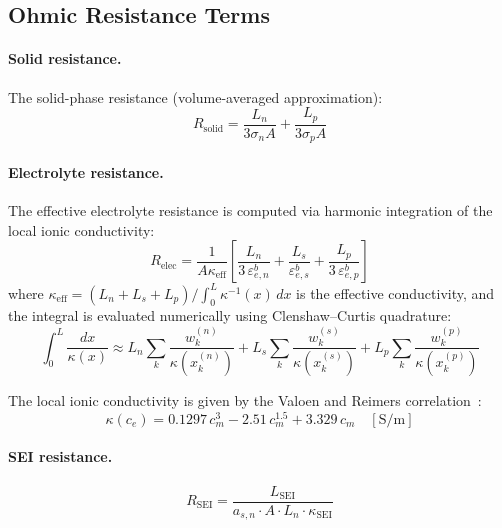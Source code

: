 \subsection{Ohmic Resistance Terms}

\paragraph{Solid resistance.} The solid-phase resistance (volume-averaged approximation):
\begin{equation}
  R_\text{solid} = \frac{L_n}{3 \sigma_n A} + \frac{L_p}{3 \sigma_p A}
  \label{eq:R_solid}
\end{equation}

\paragraph{Electrolyte resistance.} The effective electrolyte resistance is computed via harmonic integration of the local ionic conductivity:
\begin{equation}
  R_\text{elec} = \frac{1}{A \kappa_\text{eff}} \left[\frac{L_n}{3\,\varepsilon_{e,n}^b} + \frac{L_s}{\varepsilon_{e,s}^b} + \frac{L_p}{3\,\varepsilon_{e,p}^b}\right]
  \label{eq:R_elec}
\end{equation}
where $\kappa_\text{eff} = (L_n + L_s + L_p)/\int_0^L \kappa^{-1}(x)\,dx$ is the effective conductivity, and the integral is evaluated numerically using Clenshaw--Curtis quadrature:
\begin{equation}
  \int_0^L \frac{dx}{\kappa(x)} \approx L_n \sum_k \frac{w_k^{(n)}}{\kappa(x_k^{(n)})} + L_s \sum_k \frac{w_k^{(s)}}{\kappa(x_k^{(s)})} + L_p \sum_k \frac{w_k^{(p)}}{\kappa(x_k^{(p)})}
  \label{eq:int_inv_kappa}
\end{equation}

The local ionic conductivity is given by the Valoen and Reimers correlation~\cite{Valoen2005}:
\begin{equation}
  \kappa(c_e) = 0.1297\,c_m^3 - 2.51\,c_m^{1.5} + 3.329\,c_m \quad [\si{\siemens\per\meter}]
  \label{eq:kappa_correlation}
\end{equation}

\paragraph{SEI resistance.}
\begin{equation}
  R_\text{SEI} = \frac{L_\text{SEI}}{a_{s,n} \cdot A \cdot L_n \cdot \kappa_\text{SEI}}
  \label{eq:R_sei}
\end{equation}

